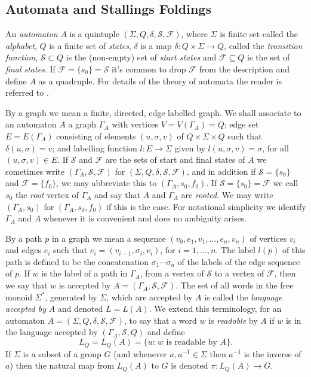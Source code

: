 \documentclass[a4paper,12pt]{article}
\newcommand{\G}{\Gamma }
\renewcommand{\d}{\delta }
\newcommand{\s}{\sigma }
\renewcommand{\S}{\Sigma }
\newcommand{\cF}{{\cal{F}}}
\newcommand{\cS}{{\cal{S}}}
\numberwithin{equation}{section}
\numberwithin{figure}{section}
\renewcommand{\cF}{\mathcal{F}}
\renewcommand{\cS}{\mathcal{S}}
\newcommand{\maps}{\rightarrow}
\begin{document}
\subsection{Automata and Stallings Foldings}\label{sub:foldings}

An {\em automaton} $A$ is  a quintuple
$(\S,Q,\d,\mathcal{S},\mathcal{F})$, where $\S$ is finite set
called the {\em alphabet}, $Q$ is a finite set of {\em states},
$\d$ is a map $\d:Q\times \S\maps Q$, called the {\em transition
function}, $\mathcal{S}\subset Q$ is the (non-empty) set of {\em
start states} and $\mathcal{F}\subseteq Q$ is the set of {\em
final states}.  If
$\mathcal{F}=\{s_0\}=\mathcal{S}$ it's common to drop
$\mathcal{F}$ from the description and define $A$ as a quadruple.
For details of the theory of automata the reader is referred to
 \cite{Lawson04}.

By a graph we mean a finite, directed, edge labelled graph.
We shall associate to an automaton $A$
a graph $\G_A$ with vertices
$V=V(\G_A)=Q$; edge set $E=E(\G_A)$ consisting of elements
$(u,\s,v)$ of $Q\times \S\times Q$ such that $\d(u,\s)=v$; and
labelling function $l:E\maps \S$ given by $l(u,\s,v)=\s$, for all
$(u,\s,v) \in E$.  If $\mathcal{S}$ and $\mathcal{F}$ are the sets
of start and final states of $A$ we sometimes write
$(\G_A,\mathcal{S},\mathcal{F})$ for
$(\S,Q,\d,\mathcal{S},\mathcal{F})$, and in addition if
$\mathcal{S}=\{s_0\}$ and $\mathcal{F}=\{f_0\}$, we may abbreviate
this to $(\G_A,s_0,f_0)$. If $\mathcal{S}=\{s_0\}=\mathcal{F}$
we
call $s_0$ the {\em root}
vertex of $\G_A$ and say that $A$ and $\G_A$ are {\em rooted}. We may
 write $(\G_A,s_0)$ for $(\G_A,s_0,f_0)$ if this is the case.  For notational simplicity we identify $\G_A$
and $A$ whenever it is convenient and does no ambiguity arises.

By a path $p$
in a graph we mean a sequence $(v_0,e_1,v_1, \ldots , e_n ,v_n)$ of
 vertices $v_i$ and edges $e_i$ such that
 $e_i=(v_{i-1},\s_i,v_i)$, for $i=1,\ldots ,n$.
The
label $l(p)$ of this  path is defined to be
 the concatenation $\s_1\cdots \s_n$ of the labels of the
edge sequence of $p$.  If $w$ is the label of a path
in $\G_A$, from a vertex of $\cS$ to a vertex of $\cF$, then we
say that $w$ is accepted by $A=(\G_A,\cS,\cF)$. The set of all
words in the free monoid $\S^*$, generated by $\S$, which are
accepted by $A$  is called
the {\em language accepted by} $A$ and denoted $L=L(A)$.
We extend this terminology, for an automaton
$A=(\S,Q,\d,\mathcal{S},\mathcal{F})$,
to say that a  word $w$ is {\em readable}
by $A$ if $w$ is in the
language accepted by $(\G_A,\cS,Q)$  and define
\[L_Q=L_Q(A)=\{w:w \textrm{ is readable by } A\}.\]
If $\S$ is a
subset of a group $G$ (and whenever $a,a^{-1}\in \S$ then $a^{-1}$ is
the inverse of $a$)
 then the  natural map from $L_Q(A)$ to
$G$ is denoted $\pi:L_Q(A)\maps G$.
\end{document}
